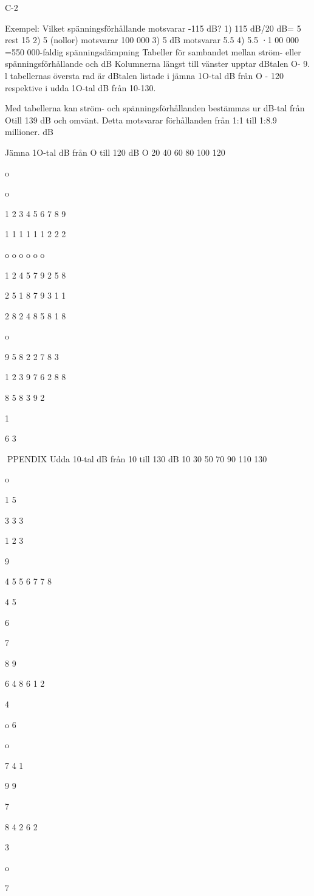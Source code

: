 \documentclass[a4paper,twoside,twocolumn,openright]{book}
\begin{document}
{{{{{{{{{{{{{C-2

Exempel: Vilket spänningsförhållande motsvarar -115 dB?
1) 115 dB/20 dB= 5 rest 15
2) 5 (nollor) motsvarar 100 000
3) 5 dB motsvarar 5.5
4) 5.5 ·1 00 000 =550 000-faldig spänningsdämpning
Tabeller för sambandet mellan ström- eller spänningsförhållande och dB
Kolumnerna längst till vänster upptar dBtalen O- 9. l tabellernas översta rad är dBtalen listade i jämna 1O-tal dB från O - 120
respektive i udda 1O-tal dB från 10-130.

Med tabellerna kan ström- och spänningsförhållanden bestämmas ur dB-tal från Otill
139 dB och omvänt.
Detta motsvarar förhållanden från 1:1 till
1:8.9 millioner.
dB

Jämna 1O-tal dB från O till 120 dB
O 20 40 60 80 100 120

o

o

1
2
3
4
5
6
7
8
9

1
1
1
1
1
1
2
2
2

o o o o o o

1
2
4
5
7
9
2
5
8

2
5
1
8
7
9
3
1
1

2
8
2
4
8
5
8
1
8

o

9
5
8
2
2
7
8
3

1
2
3
9
7
6
2
8
8

8
5
8
3
9
2

1

6
3

PPENDIX
Udda 10-tal dB från 10 till 130 dB
10 30 50 70 90 110 130

o

1
5

3
3
3

1
2
3

9

4
5
5
6
7
7
8

4
5

6

7

8
9

6
4
8
6
1
2

4

o
6

o

7
4
1

9
9

7

8
4
2
6
2

3

o

7

}}}}}}}}}}}}}
\end{document}

